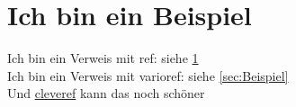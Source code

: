 \documentclass[12pt,oneside,paper=a4,ngerman]{scrartcl}
\begin{document}
\section{Ich bin ein Beispiel}\label{sec:Beispiel}

\blindtext
\clearpage

Ich bin ein Verweis mit ref: siehe \ref{sec:Beispiel}\\
Ich bin ein Verweis mit varioref: siehe \vref{sec:Beispiel}\\
Und \href{https://www.ctan.org/pkg/cleveref}{cleveref} kann das noch schöner\\
\end{document}

